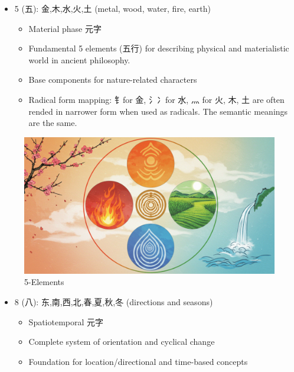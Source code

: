 \begin{itemize}
\tightlist
\item
  5 (五): 金,木,水,火,土 (metal, wood, water, fire, earth)

  \begin{itemize}
  \tightlist
  \item
    Material phase 元字
  \item
    Fundamental 5 elements (五行) for describing physical and
    materialistic world in ancient philosophy.
  \item
    Base components for nature-related characters
  \item
    Radical form mapping: 钅for 金, 氵冫for 水, 灬 for 火, 木, 土 are
    often rended in narrower form when used as radicals. The semantic
    meanings are the same.
  \end{itemize}
\end{itemize}

\begin{figure}
\centering
\includegraphics{./images/five-elements.jpg}
\caption{5-Elements}
\end{figure}

\begin{itemize}
\tightlist
\item
  8 (八): 东,南,西,北,春,夏,秋,冬 (directions and seasons)

  \begin{itemize}
  \tightlist
  \item
    Spatiotemporal 元字
  \item
    Complete system of orientation and cyclical change
  \item
    Foundation for location/directional and time-based concepts
  \end{itemize}
\end{itemize}

